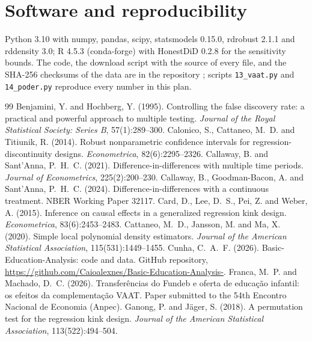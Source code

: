 \documentclass[11pt]{article}
\begin{document}
\section{Software and reproducibility}

Python 3.10 with numpy, pandas, scipy, statsmodels 0.15.0, rdrobust 2.1.1 and rddensity 3.0; R 4.5.3 (conda-forge) with HonestDiD 0.2.8 for the sensitivity bounds. The code, the download script with the source of every file, and the SHA-256 checksums of the data are in the repository \citep{cunha2026}; scripts \texttt{13\_vaat.py} and \texttt{14\_poder.py} reproduce every number in this plan.

\begin{thebibliography}{99}
 Benjamini, Y. and Hochberg, Y. (1995). Controlling the false discovery rate: a practical and powerful approach to multiple testing. \textit{Journal of the Royal Statistical Society: Series B}, 57(1):289--300.
 Calonico, S., Cattaneo, M.~D. and Titiunik, R. (2014). Robust nonparametric confidence intervals for regression-discontinuity designs. \textit{Econometrica}, 82(6):2295--2326.
 Callaway, B. and Sant'Anna, P.~H.~C. (2021). Difference-in-differences with multiple time periods. \textit{Journal of Econometrics}, 225(2):200--230.
 Callaway, B., Goodman-Bacon, A. and Sant'Anna, P.~H.~C. (2024). Difference-in-differences with a continuous treatment. NBER Working Paper 32117.
 Card, D., Lee, D.~S., Pei, Z. and Weber, A. (2015). Inference on causal effects in a generalized regression kink design. \textit{Econometrica}, 83(6):2453--2483.
 Cattaneo, M.~D., Jansson, M. and Ma, X. (2020). Simple local polynomial density estimators. \textit{Journal of the American Statistical Association}, 115(531):1449--1455.
 Cunha, C.~A.~F. (2026). Basic-Education-Analysis: code and data. GitHub repository, \url{https://github.com/Caioalexnes/Basic-Education-Analysis-}.
 Franca, M.~P. and Machado, D.~C. (2026). Transferências do Fundeb e oferta de educação infantil: os efeitos da complementação VAAT. Paper submitted to the 54th Encontro Nacional de Economia (Anpec).
 Ganong, P. and J\"ager, S. (2018). A permutation test for the regression kink design. \textit{Journal of the American Statistical Association}, 113(522):494--504.

\end{thebibliography}
\end{document}
